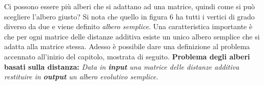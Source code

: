 \newline
Ci possono essere più alberi che si adattano ad una matrice, quindi come si può scegliere l'albero giusto? Si nota che quello in figura 6 ha tutti i vertici di grado diverso da due e viene definito \textit{albero semplice}. 
\newpage
Una caratteristica importante è che per ogni matrice delle distanze additiva esiste un unico albero semplice che si adatta alla matrice stessa.
\newline
Adesso è possibile dare una definizione al problema accennato all'inizio del capitolo, mostrata di seguito.
\newline
\newline
\textbf{Problema degli alberi basati sulla distanza:}
\newline
\textit{Data in \textbf{input} una matrice delle distanze additiva restituire in \textbf{output} un albero evolutivo semplice.}

\newpage

